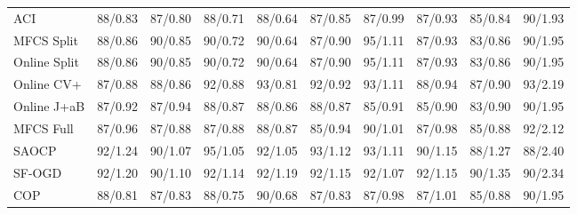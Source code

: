 \documentclass[11pt]{article}
\begin{document}
\begin{table}[h]
{\begin{tabular}{lrrrrrrrrr}
ACI & 88/0.83 & 87/0.80 & 88/0.71 & 88/0.64 & 87/0.85 & 87/0.99 & 87/0.93 & 85/0.84 & 90/1.93\\
MFCS Split & 88/0.86 & 90/0.85 & 90/0.72 & 90/0.64 & 87/0.90 & 95/1.11 & 87/0.93 & \textcolor{red!70!black}{83/0.86} & 90/1.95\\
Online Split & 88/0.86 & 90/0.85 & 90/0.72 & 90/0.64 & 87/0.90 & 95/1.11 & 87/0.93 & \textcolor{red!70!black}{83/0.86} & 90/1.95\\
Online CV+ & 87/0.88 & 88/0.86 & 92/0.88 & 93/0.81 & 92/0.92 & 93/1.11 & 88/0.94 & 87/0.90 & 93/2.19\\
Online J+aB & 87/0.92 & 87/0.94 & 88/0.87 & 88/0.86 & 88/0.87 & 85/0.91 & 85/0.90 & \textcolor{red!70!black}{83/0.90} & 90/1.95\\
MFCS Full & 87/0.96 & 87/0.88 & 87/0.88 & 88/0.87 & 85/0.94 & 90/1.01 & 87/0.98 & 85/0.88 & 92/2.12\\
SAOCP & 92/1.24 & 90/1.07 & 95/1.05 & 92/1.05 & 93/1.12 & 93/1.11 & 90/1.15 & 88/1.27 & 88/2.40\\
SF-OGD & 92/1.20 & 90/1.10 & 92/1.14 & 92/1.19 & 92/1.15 & 92/1.07 & 92/1.15 & 90/1.35 & 90/2.34\\
COP & 88/0.81 & 87/0.83 & 88/0.75 & 90/0.68 & 87/0.83 & 87/0.98 & 87/1.01 & 85/0.88 & 90/1.95\\
\bottomrule\end{tabular}}\end{table}
\end{document}
